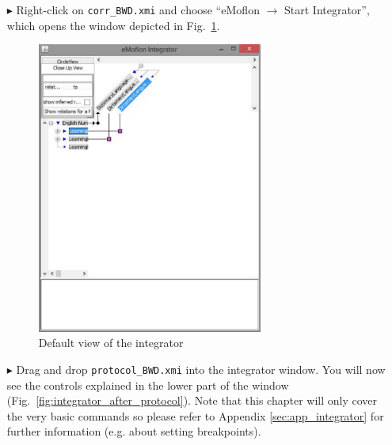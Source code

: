 \begin{enumerate}


\item[$\blacktriangleright$] Right-click on \texttt{corr\_BWD.xmi} and choose ``eMoflon $\rightarrow$ Start Integrator'', which opens the window depicted in Fig.~\ref{fig:integrator_start}.

\begin{figure}[htbp]
\begin{center}
  \includegraphics[width=0.7\textwidth]{pics/tggBilder/transformation/integrator_start_view}
  \caption{Default view of the integrator}
  \label{fig:integrator_start}
\end{center}
\end{figure}

\item[$\blacktriangleright$] Drag and drop \texttt{protocol\_BWD.xmi} into the integrator window. 
You will now see the controls explained in the lower part of the window 
(Fig.~\ref{fig:integrator_after_protocol}). 
Note that this chapter will only cover the very basic commands so please refer to 
Appendix \ref{sec:app_integrator} for further information (e.g. about setting breakpoints).


\end{enumerate}
